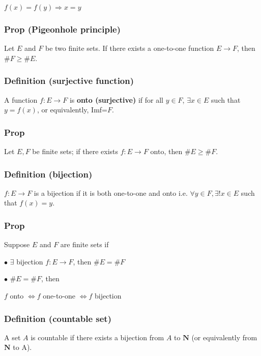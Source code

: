             \vspace{5pt}
            \centerline{$f(x)=f(y) \Rightarrow x=y$}
			
			\subsubsection{Prop (Pigeonhole principle)}
			Let $E$ and $F$ be two finite sets. If there exists a one-to-one function $E \rightarrow F$, then $\#F \geq \#E$.
			
			\subsubsection{Definition (surjective function)}
			A function $f: E \rightarrow F$ is \textbf{onto (surjective)} if for all $y \in F$, $\exists x \in E$ such that $y=f(x)$, or equivalently, Imf=$F$.
			
			\subsubsection{Prop}
			Let $E,F$ be finite sets; if there exists $f:E\rightarrow F$ onto, then $\# E \geq \# F$.
			
			\subsubsection{Definition (bijection)}
			$f: E \rightarrow F$ is a bijection if it is both one-to-one and onto i.e. $\forall y\in F, \exists! x\in E$ such that $f(x)=y$.
			
			\subsubsection{Prop}
			Suppose $E$ and $F$ are finite sets if
			
				$\bullet$ $\exists$ bijection $f: E \rightarrow F$, then $\#E=\#F$
				
				$\bullet$ $\#E=\#F$, then
				
				\centerline{$f$ onto $\Leftrightarrow f$ one-to-one $\Leftrightarrow f$ bijection}
				
			\subsubsection{Definition (countable set)}
			A set $A$ is countable if there exists a bijection from $A$ to $\mathbf{N}$ (or equivalently from $\mathbf{N}$ to A).